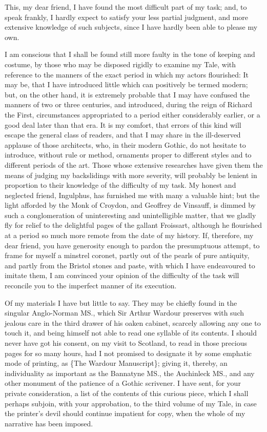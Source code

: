 This, my dear friend, I have found the most difficult part of my task;
and, to speak frankly, I hardly expect to satisfy your less partial
judgment, and more extensive knowledge of such subjects, since I have
hardly been able to please my own.

I am conscious that I shall be found still more faulty in the tone of
keeping and costume, by those who may be disposed rigidly to examine my
Tale, with reference to the manners of the exact period in which my
actors flourished: It may be, that I have introduced little which can
positively be termed modern; but, on the other hand, it is extremely
probable that I may have confused the manners of two or three centuries,
and introduced, during the reign of Richard the First, circumstances
appropriated to a period either considerably earlier, or a good deal
later than that era. It is my comfort, that errors of this kind will
escape the general class of readers, and that I may share in the
ill-deserved applause of those architects, who, in their modern Gothic,
do not hesitate to introduce, without rule or method, ornaments proper
to different styles and to different periods of the art. Those whose
extensive researches have given them the means of judging my
backslidings with more severity, will probably be lenient in proportion
to their knowledge of the difficulty of my task. My honest and neglected
friend, Ingulphus, has furnished me with many a valuable hint; but the
light afforded by the Monk of Croydon, and Geoffrey de Vinsauff, is
dimmed by such a conglomeration of uninteresting and unintelligible
matter, that we gladly fly for relief to the delightful pages of the
gallant Froissart, although he flourished at a period so much more
remote from the date of my history. If, therefore, my dear friend, you
have generosity enough to pardon the presumptuous attempt, to frame for
myself a minstrel coronet, partly out of the pearls of pure antiquity,
and partly from the Bristol stones and paste, with which I have
endeavoured to imitate them, I am convinced your opinion of the
difficulty of the task will reconcile you to the imperfect manner of its
execution.

Of my materials I have but little to say. They may be chiefly found in
the singular Anglo-Norman MS., which Sir Arthur Wardour preserves with
such jealous care in the third drawer of his oaken cabinet, scarcely
allowing any one to touch it, and being himself not able to read one
syllable of its contents. I should never have got his consent, on my
visit to Scotland, to read in those precious pages for so many hours,
had I not promised to designate it by some emphatic mode of printing, as
\{The Wardour Manuscript\}; giving it, thereby, an individuality as
important as the Bannatyne MS., the Auchinleck MS., and any other
monument of the patience of a Gothic scrivener. I have sent, for your
private consideration, a list of the contents of this curious piece,
which I shall perhaps subjoin, with your approbation, to the third
volume of my Tale, in case the printer's devil should continue impatient
for copy, when the whole of my narrative has been imposed.

